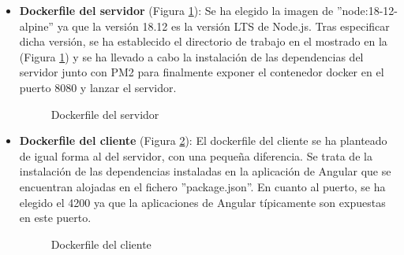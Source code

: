 \begin{itemize}
    \item \textbf{Dockerfile del servidor} (Figura \ref{fig:docker-back}): Se ha elegido la imagen de ''node:18-12-alpine'' ya que la versión 18.12 es la versión LTS de Node.js. Tras especificar dicha versión, se ha establecido el directorio de trabajo en el mostrado en la (Figura \ref{fig:docker-back}) y se ha llevado a cabo la instalación de las dependencias del servidor junto con PM2 para finalmente exponer el contenedor docker en el puerto 8080 y lanzar el servidor.
    
    \begin{figure}[H]
        \caption{Dockerfile del servidor}
        \label{fig:docker-back}
    \end{figure}
    
    \item \textbf{Dockerfile del cliente} (Figura \ref{fig:docker-front}): El dockerfile del cliente se ha planteado de igual forma al del servidor, con una pequeña diferencia. Se trata de la instalación de las dependencias instaladas en la aplicación de Angular que se encuentran alojadas en el fichero ''package.json''. En cuanto al puerto, se ha elegido el 4200 ya que la aplicaciones de Angular típicamente son expuestas en este puerto.
    
    \begin{figure}[H]
        \caption{Dockerfile del cliente}
        \label{fig:docker-front}
    \end{figure}


\end{itemize}

